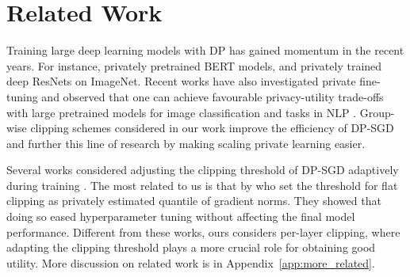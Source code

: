 \section{Related Work}


Training large deep learning models with DP has gained momentum in the recent years. For instance, \cite{anil2021large} privately pretrained BERT models, and \cite{kurakin2022toward} privately trained deep ResNets on ImageNet.
Recent works have also investigated private fine-tuning \citep{kerrigan2020differentially,tian2021seqpate,senge2021one,hoory2021learning,basu2021benchmarking,yu2021large} and observed that one can achieve favourable privacy-utility trade-offs with large pretrained models for image classification \citep{luo2021scalable,tramer2021differentially,golatkar2022mixed,de2022unlocking,mehta2022large} and tasks in NLP \citep{yu2022differentially,li2022large,li2022does}.
Group-wise clipping schemes considered in our work improve the efficiency of DP-SGD and further this line of research by making scaling private learning easier.


Several works considered adjusting the clipping threshold of DP-SGD adaptively during training \citep{pichapati2019adaclip,asi2021private}. 
The most related to us is that by \cite{andrew2019differentially} who set the threshold for flat clipping as privately estimated quantile of gradient norms.
They showed that doing so eased hyperparameter tuning without affecting the final model performance.
Different from these works, ours considers per-layer clipping, where adapting the clipping threshold plays a more crucial role for obtaining good utility. More discussion on related work is in Appendix~\ref{app:more_related}.






